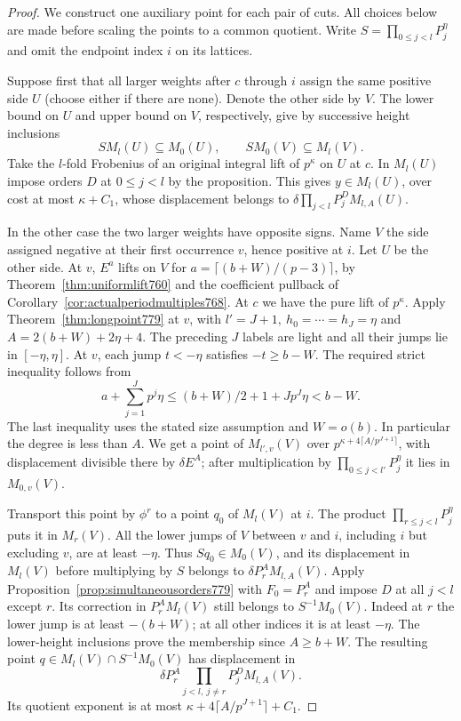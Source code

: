 \documentclass[a4paper,11pt]{article}
\theoremstyle{definition}
\theoremstyle{remark}
\numberwithin{equation}{section}
\begin{document}
\begin{proof}
We construct one auxiliary point for each pair of cuts.
All choices below are made before scaling the points to
a common quotient. Write
\(S=\prod_{0\le j<l}P_j^\eta\) and omit the endpoint
index \(i\) on its lattices.

Suppose first that all larger weights after \(c\) through
\(i\) assign the same positive side \(U\) (choose either
if there are none). Denote the other side by \(V\). The
lower bound on \(U\) and upper bound on \(V\), respectively,
give by successive height inclusions
\[
       S M_l(U)\subseteq M_0(U),\qquad
       S M_0(V)\subseteq M_l(V).
\]
Take the \(l\)-fold Frobenius of an original integral
lift of \(p^\kappa\) on \(U\) at \(c\). In \(M_l(U)\)
impose orders \(D\) at \(0\le j<l\) by the proposition.
This gives \(y\in M_l(U)\), over cost at most \(\kappa+C_1\),
whose displacement belongs to
\(\delta\prod_{j<l}P_j^D M_{l,A}(U)\).

In the other case the two larger weights have opposite
signs. Name \(V\) the side assigned negative at their
first occurrence \(v\), hence positive at \(i\). Let
\(U\) be the other side. At \(v\), \(E^a\) lifts on
\(V\) for \(a=\lceil(b+W)/(p-3)\rceil\), by
Theorem~\ref{thm:uniformlift760} and the coefficient
pullback of Corollary~\ref{cor:actualperiodmultiples768}.
At \(c\) we have the pure lift of \(p^\kappa\). Apply
Theorem~\ref{thm:longpoint779} at \(v\), with
\(l'=J+1,\ h_0=\cdots=h_J=\eta\) and
\(A=2(b+W)+2\eta+4\). The preceding \(J\) labels are
light and all their jumps lie in \([-\eta,\eta]\).
At \(v\), each jump \(t<-\eta\) satisfies
\(-t\ge b-W\). The required strict inequality follows
from
\[
      a+\sum_{j=1}^{J}p^j\eta
      \le (b+W)/2+1+Jp^J\eta < b-W .
\]
The last inequality uses the stated size assumption and
\(W=o(b)\). In particular the degree is less than \(A\).
We get a point of \(M_{l',v}(V)\) over
\(p^{\kappa+4\lceil A/p^{J+1}\rceil}\), with
displacement divisible there by \(\delta E^A\); after
multiplication by \(\prod_{0\le j<l'}P_j^\eta\) it lies
in \(M_{0,v}(V)\).

Transport this point by \(\phi^r\) to a point \(q_0\)
of \(M_l(V)\) at \(i\). The product
\(\prod_{r\le j<l}P_j^\eta\) puts it in \(M_r(V)\).
All the lower jumps of \(V\) between \(v\) and \(i\),
including \(i\) but excluding \(v\), are at least
\(-\eta\). Thus \(S q_0\in M_0(V)\), and its displacement
in \(M_l(V)\) before multiplying by \(S\) belongs to
\(\delta P_r^A M_{l,A}(V)\).
Apply Proposition~\ref{prop:simultaneousorders779}
with \(F_0=P_r^A\) and impose \(D\) at all \(j<l\)
except \(r\). Its correction in \(P_r^A M_l(V)\) still
belongs to \(S^{-1}M_0(V)\). Indeed at \(r\) the lower
jump is at least \(-(b+W)\); at all other indices it
is at least \(-\eta\). The lower-height inclusions prove
the membership since \(A\ge b+W\). The resulting point
\(q\in M_l(V)\cap S^{-1}M_0(V)\) has displacement in
\[
            \delta P_r^A\prod_{j<l,\ j\ne r}P_j^D M_{l,A}(V).
\]
Its quotient exponent is at most
\(\kappa+4\lceil A/p^{J+1}\rceil+C_1\).


\end{proof}
\end{document}
